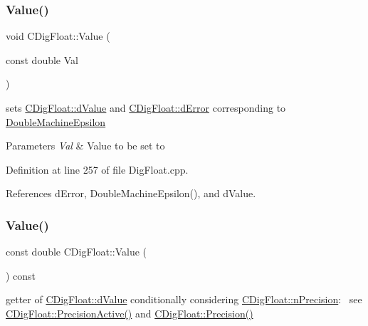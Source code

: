 \mbox{\label{classCDigFloat_af74b8cd0935294b6371f551b7a1ff640}} 
\subsubsection{\texorpdfstring{Value()}{Value()}\hspace{0.1cm}{\footnotesize\ttfamily [1/2]}}
{\footnotesize\ttfamily void C\+Dig\+Float\+::\+Value (\begin{DoxyParamCaption}\item[{const double}]{Val }\end{DoxyParamCaption})}



sets \hyperlink{classCDigFloat_a4bbe69e30dd4e20527362493aa9aaf96}{C\+Dig\+Float\+::d\+Value} and \hyperlink{classCDigFloat_a25eb3782d1e727ff007a48f8308e3d4d}{C\+Dig\+Float\+::d\+Error} corresponding to \hyperlink{Utils_8h_ae9dfc174daaf6261f167ccc069efea93}{Double\+Machine\+Epsilon} 


\begin{DoxyParams}{Parameters}
{\em Val} & Value to be set to \\
\hline
\end{DoxyParams}


Definition at line 257 of file Dig\+Float.\+cpp.



References d\+Error, Double\+Machine\+Epsilon(), and d\+Value.

\mbox{\label{classCDigFloat_a308ccc3e3c96dd81977033e0a94344fd}} 
\subsubsection{\texorpdfstring{Value()}{Value()}\hspace{0.1cm}{\footnotesize\ttfamily [2/2]}}
{\footnotesize\ttfamily const double C\+Dig\+Float\+::\+Value (\begin{DoxyParamCaption}{ }\end{DoxyParamCaption}) const\hspace{0.3cm}{\ttfamily [inline]}}



getter of \hyperlink{classCDigFloat_a4bbe69e30dd4e20527362493aa9aaf96}{C\+Dig\+Float\+::d\+Value} conditionally considering \hyperlink{classCDigFloat_ad580654be35246d14c91482581c0bc11}{C\+Dig\+Float\+::n\+Precision}\+:~\newline
 see \hyperlink{classCDigFloat_a4d6ca24beda280be719374c2a6b2c64d}{C\+Dig\+Float\+::\+Precision\+Active()} and \hyperlink{classCDigFloat_a95875f6f7246debee0d00b0c41c82aee}{C\+Dig\+Float\+::\+Precision()} 

